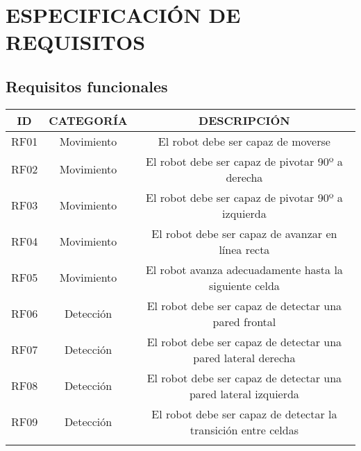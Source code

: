 \chapter{ESPECIFICACIÓN DE REQUISITOS}

\vspace{-20pt}
\section{Requisitos funcionales}

\begin{center}
\begin{table}[h!]
  \begin{adjustbox}{max width=\textwidth}
  \begin{tabular}{|c|c|c|}
    \hline
    ID & CATEGORÍA & DESCRIPCIÓN \\ \hline
    \rowcolor{gray!20}

    RF01 & Movimiento & El robot debe ser capaz de moverse  \\ \hline
    \rowcolor{gray!20}

    RF02 & Movimiento & El robot debe ser capaz de pivotar 90º a derecha \\ \hline
    \rowcolor{gray!20}

    RF03 & Movimiento & El robot debe ser capaz de pivotar 90º a izquierda \\ \hline
    \rowcolor{gray!20}

    RF04 & Movimiento & El robot debe ser capaz de avanzar en línea recta \\ \hline
    \rowcolor{gray!20}

    RF05 & Movimiento & El robot avanza adecuadamente hasta la siguiente celda  \\ \hline
    \rowcolor{red!20}

    RF06 & Detección & El robot debe ser capaz de detectar una pared frontal    \\ \hline
    \rowcolor{red!20}

    RF07 & Detección & El robot debe ser capaz de detectar una pared lateral derecha \\ \hline
    \rowcolor{red!20}

    RF08 & Detección & El robot debe ser capaz de detectar una pared lateral izquierda \\ \hline
    \rowcolor{red!20}

    RF09 & Detección  & El robot debe ser capaz de detectar la transición entre celdas \\ \hline
    \rowcolor{red!20}


\end{tabular}
\end{adjustbox}
\end{table}
\end{center}
